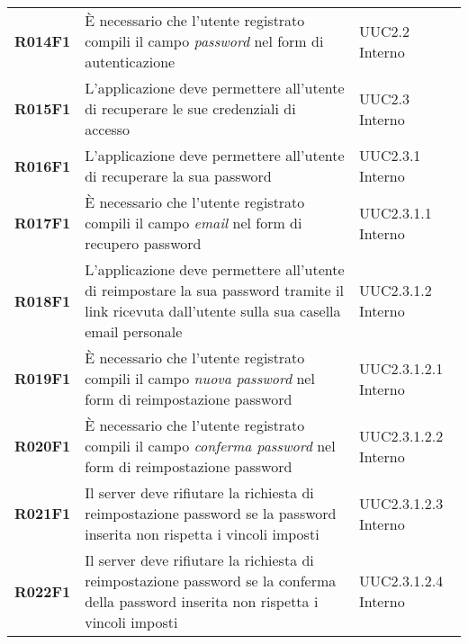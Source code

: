 \documentclass[../analisi-dei-requisiti.tex]{subfiles}
\begin{document}
\begin{longtable}[H]{>{\centering\bfseries}m{3cm} >{\centering}m{10cm} >{\centering\arraybackslash}m{3cm}}
  R014F1                               & È necessario che l'utente registrato compili il campo \textit{password} nel form di autenticazione                                                                                                      & UUC2.2 Interno                \\
  R015F1                               & L'applicazione deve permettere all'utente di recuperare le sue credenziali di accesso                                                                                                                   & UUC2.3 Interno                \\
  R016F1                               & L'applicazione deve permettere all'utente di recuperare la sua password                                                                                                                                 & UUC2.3.1 Interno              \\
  R017F1                               & È necessario che l'utente registrato compili il campo \textit{email} nel form di recupero password                                                                                                      & UUC2.3.1.1 Interno            \\
  R018F1                               & L'applicazione deve permettere all'utente di reimpostare la sua password tramite il link ricevuta dall'utente sulla sua casella email personale                                                         & UUC2.3.1.2 Interno            \\
  R019F1                               & È necessario che l'utente registrato compili il campo \textit{nuova password} nel form di reimpostazione password                                                                                       & UUC2.3.1.2.1 Interno          \\
  R020F1                               & È necessario che l'utente registrato compili il campo \textit{conferma password} nel form di reimpostazione password                                                                                    & UUC2.3.1.2.2 Interno          \\
  R021F1                               & Il server deve rifiutare la richiesta di reimpostazione password se la password inserita non rispetta i vincoli imposti                                                                                 & UUC2.3.1.2.3 Interno          \\
  R022F1                               & Il server deve rifiutare la richiesta di reimpostazione password se la conferma della password inserita non rispetta i vincoli imposti                                                                  & UUC2.3.1.2.4 Interno          \\

\end{longtable}
\end{document}
